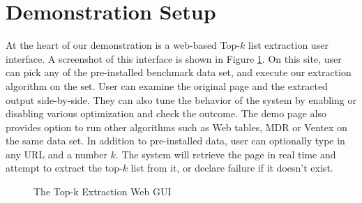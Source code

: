 \section{Demonstration Setup}
At the heart of our demonstration is a web-based Top-$k$ list
extraction user interface. A screenshot of this interface is
shown in Figure \ref{fig:gui}. On this site, user can pick any
of the pre-installed benchmark data set, and execute
our extraction algorithm on the set. User can examine the original
page and the extracted output side-by-side. They can also tune the behavior
of the system by enabling or disabling various optimization and
check the outcome. The demo page also provides option to run
other algorithms such as Web tables, MDR or Ventex on the same data
set. In addition to pre-installed data, user can optionally
type in any URL and a number $k$. The system will retrieve the 
page in real time and attempt to extract the top-$k$ list from it,
or declare failure if it doesn't exist.


\begin{figure}[th]
	\centering
\caption{The Top-k Extraction Web GUI}
\label{fig:gui}
\end{figure}

